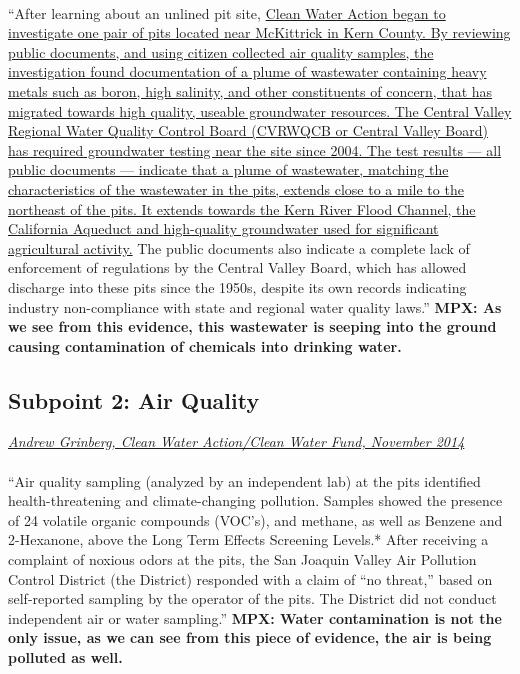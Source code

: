 \documentclass[11pt]{article}
\begin{document}
	\paragraph{}
	``After learning about an unlined pit site, \ul{Clean Water Action began to investigate one pair of pits located near McKittrick in Kern County. By reviewing public documents, and using citizen collected air quality samples, the investigation found documentation of a plume of wastewater containing heavy metals such as boron, high salinity, and other constituents of concern, that has migrated towards high quality, useable groundwater resources. The Central Valley Regional Water Quality Control Board (CVRWQCB or Central Valley Board) has required groundwater testing near the site since 2004. The test results — all public documents — indicate that a plume of wastewater, matching the characteristics of the wastewater in the pits, extends close to a mile to the northeast of the pits. It extends towards the Kern River Flood Channel, the California Aqueduct and high-quality groundwater used for significant agricultural activity.} The public documents also indicate a complete lack of enforcement of regulations by the Central Valley Board, which has allowed discharge into these pits since the 1950s, despite its own records indicating industry non-compliance with state and regional water quality laws.''\newline
	\textbf{MPX: As we see from this evidence, this wastewater is seeping into the ground causing contamination of chemicals into drinking water.}
	
	\subsection{Subpoint 2: Air Quality}
	\textit{\ul{Andrew Grinberg, Clean Water Action/Clean Water Fund, November 2014}}
	\paragraph{}
	``Air quality sampling (analyzed by an independent lab) at the pits identified health-threatening and climate-changing pollution. Samples showed the presence of 24 volatile organic compounds (VOC’s), and methane, as well as Benzene and 2-Hexanone, above the Long Term Effects Screening Levels.* After receiving a complaint of noxious odors at the pits, the San Joaquin Valley Air Pollution Control District (the District) responded with a claim of “no threat,” based on self-reported sampling by the operator of the pits. The District did not conduct independent air or water sampling.''\newline
	\textbf{MPX: Water contamination is not the only issue, as we can see from this piece of evidence, the air is being polluted as well.}
	
\end{document}
